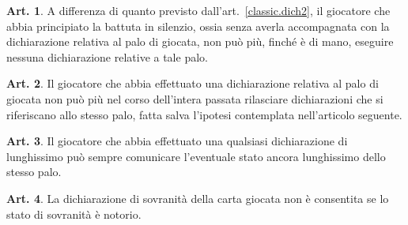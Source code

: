 \documentclass[italian,a4paper]{book}
\theoremstyle{definition}
\newtheorem{art}{Art.}
\begin{document}
\begin{art}
    A differenza di quanto previsto dall'art.~\ref{classic.dich2}, il giocatore che abbia principiato la battuta in silenzio, ossia senza averla accompagnata con la dichiarazione relativa al palo di giocata, non può più, finché è di mano, eseguire nessuna dichiarazione relative a tale palo.
\end{art}
\begin{art}
Il giocatore che abbia effettuato una dichiarazione relativa al palo di giocata non può più nel corso dell'intera passata rilasciare dichiarazioni che si riferiscano allo stesso palo, fatta salva l'ipotesi contemplata nell'articolo seguente.
\end{art}
\begin{art}
Il giocatore che abbia effettuato una qualsiasi dichiarazione di lunghissimo può sempre comunicare l'eventuale stato ancora lunghissimo dello stesso palo.
\end{art}
\begin{art}
La dichiarazione di sovranità della carta giocata non è consentita se lo stato di sovranità è notorio.
\end{art}
\end{document}
